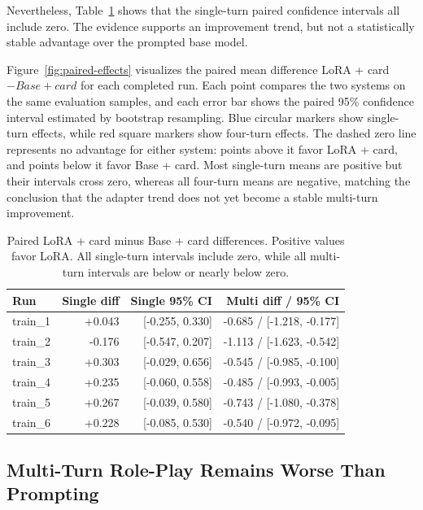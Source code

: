 \documentclass{article}
\newcommand{\card}{Base + card\xspace}
\newcommand{\lora}{LoRA + card\xspace}
\begin{document}
Nevertheless, Table~\ref{tab:paired} shows that the single-turn paired
confidence intervals all include zero. The evidence supports an improvement
trend, but not a statistically stable advantage over the prompted base model.

\figPairedEffects

Figure~\ref{fig:paired-effects} visualizes the paired mean difference
\lora$-\card$ for each completed run. Each point compares the two systems on
the same evaluation samples, and each error bar shows the paired 95\%
confidence interval estimated by bootstrap resampling. Blue circular markers
show single-turn effects, while red square markers show four-turn effects. The
dashed zero line represents no advantage for either system: points above it
favor \lora, and points below it favor \card. Most single-turn means are
positive but their intervals cross zero, whereas all four-turn means are
negative, matching the conclusion that the adapter trend does not yet become a
stable multi-turn improvement.

\begin{table}[t]
  \centering
  \caption{Paired \lora minus \card differences. Positive values favor LoRA.
  All single-turn intervals include zero, while all multi-turn intervals are
  below or nearly below zero.}
  \label{tab:paired}
  \small
  \begin{tabular}{lrrr}
    \toprule
    Run & Single diff & Single 95\% CI & Multi diff / 95\% CI \\
    \midrule
    train\_1 & +0.043 & [-0.255, 0.330] & -0.685 / [-1.218, -0.177] \\
    train\_2 & -0.176 & [-0.547, 0.207] & -1.113 / [-1.623, -0.542] \\
    train\_3 & +0.303 & [-0.029, 0.656] & -0.545 / [-0.985, -0.100] \\
    train\_4 & +0.235 & [-0.060, 0.558] & -0.485 / [-0.993, -0.005] \\
    train\_5 & +0.267 & [-0.039, 0.580] & -0.743 / [-1.080, -0.378] \\
    train\_6 & +0.228 & [-0.085, 0.530] & -0.540 / [-0.972, -0.095] \\
    \bottomrule
  \end{tabular}
\end{table}

\subsection{Multi-Turn Role-Play Remains Worse Than Prompting}
\end{document}
